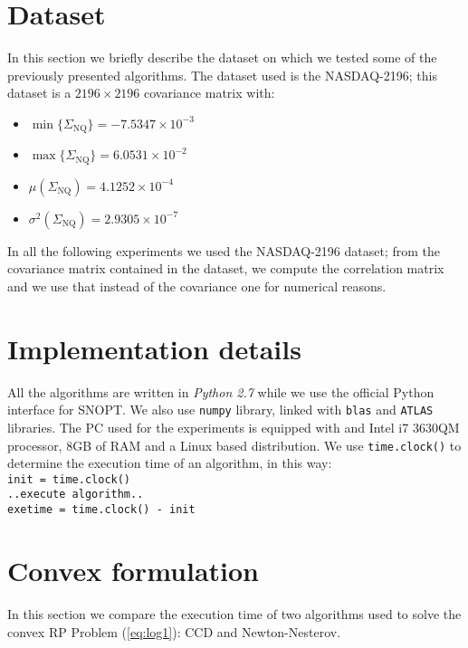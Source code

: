 \section{Dataset}
In this section we briefly describe the dataset on which we tested some of the previously presented algorithms. The dataset used is the NASDAQ-2196\footnotemark[1]; this dataset is a $2196 \times 2196$ covariance matrix with:
\begin{itemize}
\item $\min \{\Sigma_{\text{NQ}}\} = -7.5347 \times 10^{-3} $
\item $\max \{\Sigma_{\text{NQ}}\} = 6.0531 \times 10^{-2} $
\item $\mu(\Sigma_{\text{NQ}}) = 4.1252 \times 10^{-4} $
\item $\sigma^2(\Sigma_{\text{NQ}}) = 2.9305 \times 10^{-7}$
\end{itemize}
In all the following experiments we used the NASDAQ-2196 dataset; from the covariance matrix contained in the dataset, we compute the correlation matrix and we use that instead of the covariance one for numerical reasons.

\section{Implementation details}
All the algorithms are written in \textit{Python 2.7} while we use the official Python interface for SNOPT. We also use \texttt{numpy} library, linked with \texttt{blas} and \texttt{ATLAS} libraries. The PC used for the experiments is equipped with and Intel i7 3630QM processor, 8GB of RAM and a Linux based distribution. We use \texttt{time.clock()} to determine the execution time of an algorithm, in this way:\\
\texttt{init = time.clock()}\\
\texttt{..execute algorithm..}\\
\texttt{exetime = time.clock() - init}

\section{Convex formulation}
In this section we compare the execution time of two algorithms used to solve the convex RP Problem (\ref{eq:log1}): CCD and Newton-Nesterov.
